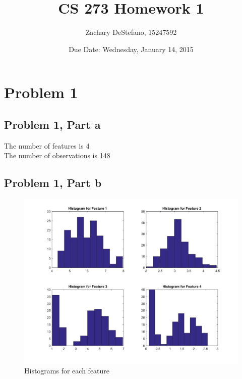 \documentclass[11pt,psfig]{article}
\begin{document}
\setlength{\parskip}{1.2ex plus0.3ex minus 0.3ex}


\thispagestyle{empty} \pagestyle{myheadings} 



\title{CS 273 Homework 1}
\author{Zachary DeStefano, 15247592}
\date{Due Date: Wednesday, January 14, 2015}

\maketitle

\vfill\eject


\section*{Problem 1}

\subsection*{Problem 1, Part a}

The number of features is 4\\
The number of observations is 148\\

\subsection*{Problem 1, Part b}

\begin{figure}[H]
\centering
\includegraphics[width=\columnwidth]{prob1bHistograms.jpg}
\caption{Histograms for each feature}
\end{figure}
\end{document}
